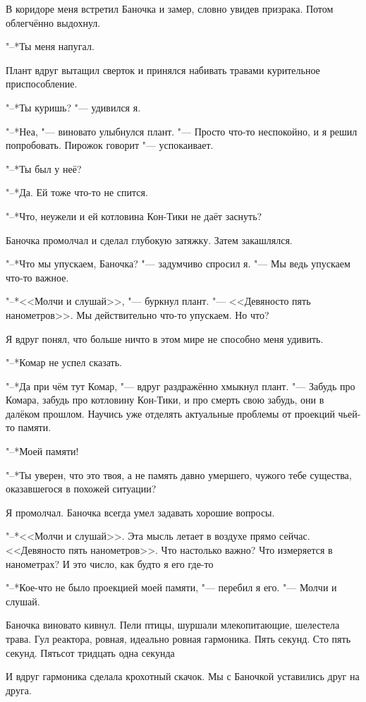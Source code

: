 \documentclass[a4paper,10pt]{book}
\newcommand{\ldotst}{\so{...}\xspace}
\begin{document}
В коридоре меня встретил Баночка и замер, словно увидев призрака. Потом 
облегчённо выдохнул.

"--*Ты меня напугал.

Плант вдруг вытащил сверток и принялся набивать травами курительное 
приспособление.

"--*Ты куришь? "--- удивился я.

"--*Неа, "--- виновато улыбнулся плант. "--- Просто что-то неспокойно, и я 
решил 
попробовать. Пирожок говорит "--- успокаивает.

"--*Ты был у неё?

"--*Да. Ей тоже что-то не спится.

"--*Что, неужели и ей котловина Кон-Тики не даёт заснуть?

Баночка промолчал и сделал глубокую затяжку. Затем закашлялся.

"--*Что мы упускаем, Баночка? "--- задумчиво спросил я. "--- Мы ведь упускаем 
что-то важное.

"--*<<Молчи и слушай>>, "--- буркнул плант. "--- <<Девяносто пять нанометров>>. 
Мы действительно что-то упускаем. Но что?

Я вдруг понял, что больше ничто в этом мире не способно меня удивить.

"--*Комар не успел сказать.

"--*Да при чём тут Комар, "--- вдруг раздражённо хмыкнул плант. "--- Забудь про 
Комара,
забудь про котловину Кон-Тики, и про смерть свою забудь, они в далёком прошлом. 
Научись уже отделять
актуальные проблемы от проекций чьей-то памяти.

"--*Моей памяти!

"--*Ты уверен, что это твоя, а не память давно умершего, чужого тебе существа, оказавшегося в похожей ситуации?

Я промолчал. Баночка всегда умел задавать хорошие вопросы.

"--*<<Молчи и слушай>>. Эта мысль летает в воздухе прямо сейчас.
<<Девяносто пять нанометров>>. Что настолько важно? Что измеряется в 
нанометрах? И это число, как будто я его где-то\ldotst

"--*Кое-что не было проекцией моей памяти, "--- перебил я его. "--- Молчи и 
слушай.

Баночка виновато кивнул. Пели птицы, шуршали млекопитающие, шелестела трава. 
Гул реактора, 
ровная, идеально ровная гармоника. Пять секунд. Сто пять секунд. Пятьсот 
тридцать одна секунда\ldotst

И вдруг гармоника сделала крохотный скачок. Мы с Баночкой уставились 
друг на друга.
\end{document}

